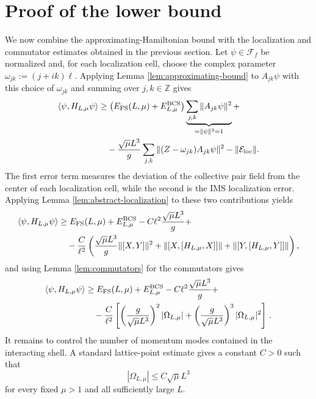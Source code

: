 \documentclass[11pt]{amsart}
\theoremstyle{definition}
\numberwithin{equation}{section}
\newcommand{\Z}{\mathbb Z}
\newcommand{\1}{\mathbf 1}
\begin{document}
\section{Proof of the lower bound}

We now combine the approximating-Hamiltonian bound with the localization and commutator estimates obtained in the previous section. Let $\psi\in\mathcal F_f$ be normalized and, for each localization cell, choose the complex parameter $\omega_{jk}:=(j+ik)\ell$. Applying Lemma \ref{lem:approximating-bound} to $A_{jk}\psi$ with this choice of $\omega_{jk}$ and summing over $j,k\in\Z$ gives
\begin{align}
 \langle\psi,H_{L,\mu}\psi\rangle
 &\ge
 \left(E_{\rm FS}(L,\mu)+ E^{\rm BCS}_{L,\mu}\right)
 \underbrace{\sum_{j,k}\|A_{jk}\psi\|^2}_{= \| \psi \|^2 = 1} +
 \nonumber\\
 &\quad
 -\frac{\sqrt{\mu}L^3}{g}
 \sum_{j,k}\|(Z-\omega_{jk})A_{jk}\psi\|^2
 -\|\mathcal{E}_{\rm loc}\|.
 \label{eq:localized-lower}
\end{align}
The first error term measures the deviation of the collective pair field from the center of each localization cell, while the second is the IMS localization error. Applying Lemma \ref{lem:abstract-localization} to these two contributions yields
\begin{align*}
 \langle\psi,H_{L,\mu}\psi\rangle
 &\ge
 E_{\rm FS}(L,\mu)+E^{\rm BCS}_{L,\mu}
 -C\ell^2\frac{\sqrt{\mu}L^3}{g} +
 \nonumber\\
 &\quad
 -\frac{C}{\ell^2}\left( \frac{\sqrt{\mu}L^3}{g}\| [X, Y] \|^2 + \|[X, [H_{L, \mu}, X]] \| + \|[Y, [H_{L, \mu}, Y]] \| \right),
\end{align*}
and using Lemma \ref{lem:commutators} for the commutators gives
\begin{align}
   \langle\psi,H_{L,\mu}\psi\rangle
 &\ge
 E_{\rm FS}(L,\mu)+E^{\rm BCS}_{L,\mu}
 -C\ell^2\frac{\sqrt{\mu}L^3}{g} +
 \nonumber\\
 &\quad
 -\frac{C}{\ell^2}\left[\left(\frac{g}{\sqrt{\mu}L^3} \right)^2|\Omega_{L,\mu}| + \left(\frac{g}{\sqrt{\mu}L^3} \right)^3|\Omega_{L,\mu}|^2 \right] \,.
 \label{eq:error-before-opt}
\end{align}
It remains to control the number of momentum modes contained in the interacting shell. A standard lattice-point estimate gives a constant $C>0$ such that
\begin{equation}\label{eq:N-bound-fixedmu}
 |\Omega_{L,\mu}|\le C \sqrt{\mu} L^3
\end{equation}
for every fixed $\mu>1$ and all sufficiently large $L$.
\end{document}
